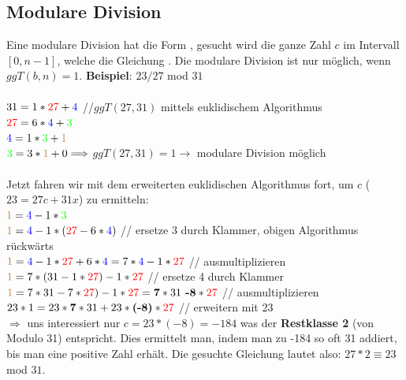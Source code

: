 \documentclass[landscape,twocolumn,a4paper]{article}
\begin{document}
\subsection{Modulare Division}
Eine modulare Division hat die Form  , gesucht wird die ganze Zahl $c$ im Intervall $[0,n-1]$, welche die Gleichung . Die modulare Division ist nur möglich, wenn $ggT(b,n)=1$. \textbf{Beispiel}: $23/27$ mod $31$
\\\\
$31 = 1 * {\color{red}27} + {\color{blue}4}$ \hspace{2cm} {\color{gray}//$ggT(27,31)$ mittels euklidischem Algorithmus} \\
${\color{red}27} = 6 * {\color{blue}4} + {\color{green}3}$ \\
${\color{blue}4} = 1 * {\color{green}3} + {\color{brown}1}$\\
${\color{green}3} = 3 * {\color{brown}1} + 0 \Longrightarrow$ $ggT(27,31) = 1 \rightarrow$  modulare Division möglich \\
\\
Jetzt fahren wir mit dem erweiterten euklidischen Algorithmus fort, um $c$ ($23 = 27c + 31x$) zu ermitteln:\\
${\color{brown}1} = {\color{blue}4} - 1 * {\color{green}3}$\\
${\color{brown}1} = {\color{blue}4} - 1 * ({\color{red}27} - 6 * {\color{blue}4})$  {\color{gray}// ersetze $3$ durch Klammer, obigen Algorithmus rückwärts}\\
${\color{brown}1} = {\color{blue}4} - 1 * {\color{red}27} + 6 * {\color{blue}4} = 7 * {\color{blue}4} - 1 * {\color{red}27}$  {\color{gray}// ausmultiplizieren}\\
${\color{brown}1} = 7 * (31 - 1 * {\color{red}27}) - 1 * {\color{red}27}$  {\color{gray}// ersetze {\color{blue}4} durch Klammer}\\
${\color{brown}1} = 7 * 31 - 7 * {\color{red}27}) - 1 * {\color{red}27} = \textbf{7} * 31 \textbf{ -8} * {\color{red}27}$  {\color{gray}// ausmultiplizieren}\\
$23 * 1 = 23 * \textbf{7} * 31 + 23 * \textbf{(-8)} * {\color{red}27}$  {\color{gray}// erweitern mit 23}\\
$\Longrightarrow$ uns interessiert nur $c = 23 * (-8) = -184$ was der \textbf{Restklasse 2} (von Modulo 31) entspricht. Dies ermittelt man, indem man zu -184 so oft 31 addiert, bis man eine positive Zahl erhält. Die gesuchte Gleichung lautet also: $27 * 2 \equiv 23$ mod $31$.
\end{document}
